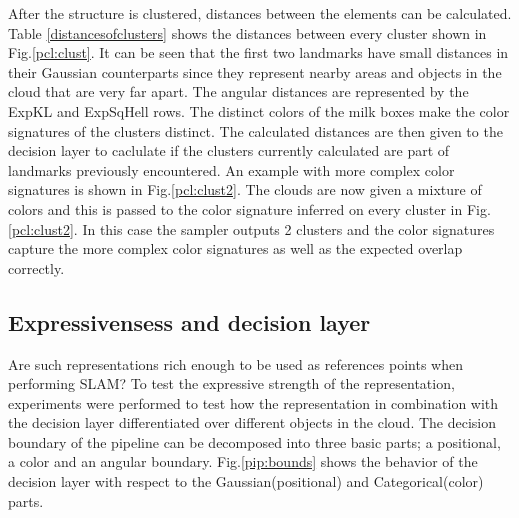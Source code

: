 \documentclass[twoside,hidelinks]{article}
\begin{document}
After the structure is clustered, distances between the elements can be calculated. Table \ref{distancesofclusters} shows the distances between every cluster shown in Fig.\ref{pcl:clust}. It can be seen that the first two landmarks have small distances in their Gaussian counterparts since they represent nearby areas and objects in the cloud that are very far apart. The angular distances are represented by the ExpKL and ExpSqHell rows. The distinct colors of the milk boxes make the color signatures of the clusters distinct. The calculated distances are then given to the decision layer to caclulate if the clusters currently calculated are part of landmarks previously encountered.
An example with more complex color signatures is shown in Fig.\ref{pcl:clust2}. The clouds are now given a mixture of colors and this is passed to the color signature inferred on every cluster in Fig.\ref{pcl:clust2}. In this case the sampler outputs 2 clusters and the color signatures capture the more complex color signatures as well as the expected overlap correctly. 

\subsection{Expressivensess and decision layer}

Are such representations rich enough to be used as references points when performing SLAM?
To test the expressive strength of the representation, experiments were performed to test how the representation in combination with the decision layer differentiated over different objects in the cloud. 
The decision boundary of the pipeline can be decomposed into three basic parts; a positional, a color and an angular boundary. Fig.\ref{pip:bounds} shows the behavior of the decision layer with respect to the Gaussian(positional) and Categorical(color) parts. 
    
\end{document}
